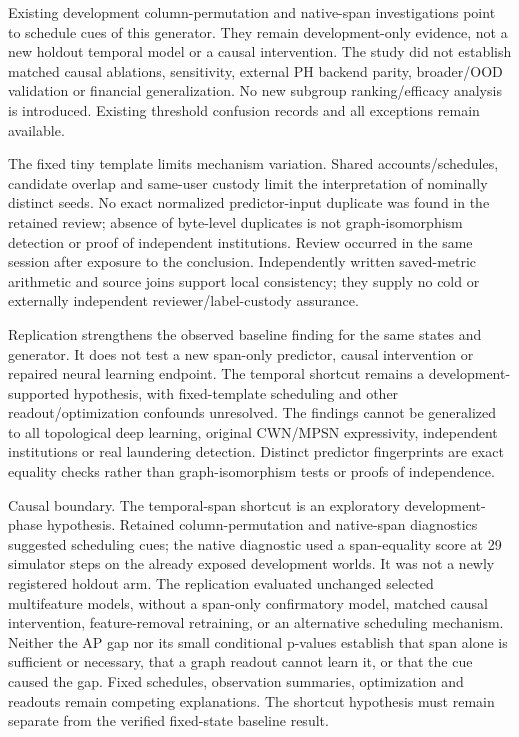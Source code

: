 \documentclass{article}
\begin{document}
Existing development column-permutation and native-span investigations point to schedule cues of this generator. They remain development-only evidence, not a new holdout temporal model or a causal intervention. The study did not establish matched causal ablations, sensitivity, external PH backend parity, broader/OOD validation or financial generalization. No new subgroup ranking/efficacy analysis is introduced. Existing threshold confusion records and all exceptions remain available.

The fixed tiny template limits mechanism variation. Shared accounts/schedules, candidate overlap and same-user custody limit the interpretation of nominally distinct seeds. No exact normalized predictor-input duplicate was found in the retained review; absence of byte-level duplicates is not graph-isomorphism detection or proof of independent institutions. Review occurred in the same session after exposure to the conclusion. Independently written saved-metric arithmetic and source joins support local consistency; they supply no cold or externally independent reviewer/label-custody assurance.

Replication strengthens the observed baseline finding for the same states and generator. It does not test a new span-only predictor, causal intervention or repaired neural learning endpoint. The temporal shortcut remains a development-supported hypothesis, with fixed-template scheduling and other readout/optimization confounds unresolved. The findings cannot be generalized to all topological deep learning, original CWN/MPSN expressivity, independent institutions or real laundering detection. Distinct predictor fingerprints are exact equality checks rather than graph-isomorphism tests or proofs of independence.

Causal boundary. The temporal-span shortcut is an exploratory development-phase hypothesis. Retained column-permutation and native-span diagnostics suggested scheduling cues; the native diagnostic used a span-equality score at 29 simulator steps on the already exposed development worlds. It was not a newly registered holdout arm. The replication evaluated unchanged selected multifeature models, without a span-only confirmatory model, matched causal intervention, feature-removal retraining, or an alternative scheduling mechanism. Neither the AP gap nor its small conditional p-values establish that span alone is sufficient or necessary, that a graph readout cannot learn it, or that the cue caused the gap. Fixed schedules, observation summaries, optimization and readouts remain competing explanations. The shortcut hypothesis must remain separate from the verified fixed-state baseline result.
\end{document}
